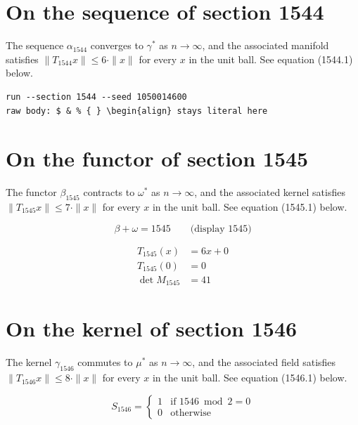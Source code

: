 \documentclass{article}
\begin{document}
\section{On the sequence of section 1544}
The sequence $\alpha_{1544}$ converges to $\gamma^{*}$ as $n \to \infty$,
and the associated manifold satisfies $\|T_{1544} x\| \leq 6 \cdot \|x\|$
for every $x$ in the unit ball. See equation (1544.1) below.

\begin{verbatim}
run --section 1544 --seed 1050014600
raw body: $ & % { } \begin{align} stays literal here
\end{verbatim}

\section{On the functor of section 1545}
The functor $\beta_{1545}$ contracts to $\omega^{*}$ as $n \to \infty$,
and the associated kernel satisfies $\|T_{1545} x\| \leq 7 \cdot \|x\|$
for every $x$ in the unit ball. See equation (1545.1) below.

$$
\beta + \omega = 1545 \qquad \text{(display 1545)}
$$

\begin{align}
T_{1545}(x) &= 6 x + 0 \\
T_{1545}(0) &= 0 \\
\det M_{1545} &= 41
\end{align}

\section{On the kernel of section 1546}
The kernel $\gamma_{1546}$ commutes to $\mu^{*}$ as $n \to \infty$,
and the associated field satisfies $\|T_{1546} x\| \leq 8 \cdot \|x\|$
for every $x$ in the unit ball. See equation (1546.1) below.

\begin{equation}
S_{1546} = \begin{cases} 1 & \text{if } 1546 \bmod 2 = 0 \\ 0 & \text{otherwise} \end{cases}
\end{equation}
\end{document}
